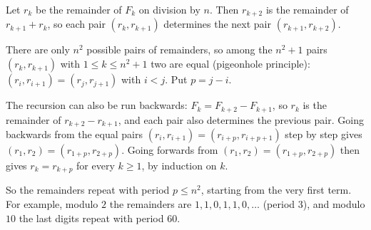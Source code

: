 Let $r_k$ be the remainder of $F_k$ on division by $n$. Then $r_{k+2}$ is the remainder of $r_{k+1}+r_k$, so each pair $(r_k,r_{k+1})$ determines the next pair $(r_{k+1},r_{k+2})$.

There are only $n^2$ possible pairs of remainders, so among the $n^2+1$ pairs $(r_k,r_{k+1})$ with $1\le k\le n^2+1$ two are equal (pigeonhole principle): $(r_i,r_{i+1})=(r_j,r_{j+1})$ with $i<j$. Put $p=j-i$.

The recursion can also be run backwards: $F_k=F_{k+2}-F_{k+1}$, so $r_k$ is the remainder of $r_{k+2}-r_{k+1}$, and each pair also determines the previous pair. Going backwards from the equal pairs $(r_i,r_{i+1})=(r_{i+p},r_{i+p+1})$ step by step gives $(r_1,r_2)=(r_{1+p},r_{2+p})$. Going forwards from $(r_1,r_2)=(r_{1+p},r_{2+p})$ then gives $r_k=r_{k+p}$ for every $k\ge1$, by induction on $k$.

So the remainders repeat with period $p\le n^2$, starting from the very first term. For example, modulo $2$ the remainders are $1,1,0,1,1,0,\dots$ (period $3$), and modulo $10$ the last digits repeat with period $60$.
